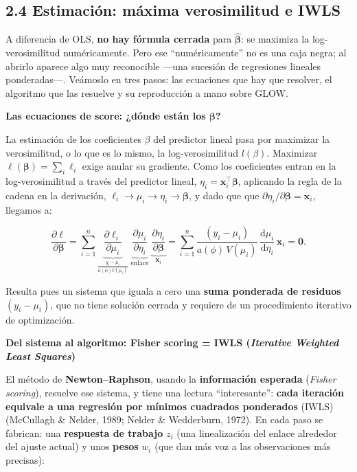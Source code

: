 \documentclass[
  letterpaper,
  DIV=11,
  numbers=noendperiod]{scrartcl}
\begin{document}
\hypertarget{sec-u12-iwls}{%
\subsection{2.4 Estimación: máxima verosimilitud e
IWLS}\label{sec-u12-iwls}}

A diferencia de OLS, \textbf{no hay fórmula cerrada} para
\(\hat{\boldsymbol\beta}\): se maximiza la log-verosimilitud
numéricamente. Pero ese ``numéricamente'' no es una caja negra; al
abrirlo aparece algo muy reconocible ---una sucesión de regresiones
lineales ponderadas---. Veámoslo en tres pasos: las ecuaciones que hay
que resolver, el algoritmo que las resuelve y su reproducción a mano
sobre GLOW.

\textbf{Las ecuaciones de score: ¿dónde están los \(\boldsymbol\beta\)?}

La estimación de los coeficientes \(\beta\) del predictor lineal pasa
por maximizar la verosimilitud, o lo que es lo mismo, la
log-verosimilitud \(l(\beta)\). Maximizar
\(\ell(\boldsymbol\beta)=\sum_i \ell_i\) exige anular su gradiente. Como
los coeficientes entran en la log-verosimilitud a través del predictor
lineal, \(\eta_i=\mathbf{x}_i^\top\boldsymbol\beta\), aplicando la regla
de la cadena en la derivación,
\(\ell_i\to\mu_i\to\eta_i\to\boldsymbol\beta\), y dado que que
\(\partial\eta_i/\partial\boldsymbol\beta=\mathbf{x}_i\), llegamos a:

\[
\frac{\partial \ell}{\partial\boldsymbol\beta}
=\sum_{i=1}^{n}
\underbrace{\frac{\partial \ell_i}{\partial\mu_i}}_{\textstyle \frac{y_i-\mu_i}{a(\phi)V(\mu_i)}}\;
\underbrace{\frac{\partial\mu_i}{\partial\eta_i}}_{\text{enlace}}\;
\underbrace{\frac{\partial\eta_i}{\partial\boldsymbol\beta}}_{\textstyle \mathbf{x}_i}
=\sum_{i=1}^{n}\frac{(y_i-\mu_i)}{a(\phi)\,V(\mu_i)}\,
\frac{\mathrm{d}\mu_i}{\mathrm{d}\eta_i}\,\mathbf{x}_i=\mathbf{0}.
\]

Resulta pues un sistema que iguala a cero una \textbf{suma ponderada de
residuos} \((y_i-\mu_i)\), que no tiene solución cerrada y requiere de
un procedimiento iterativo de optimización.

\textbf{Del sistema al algoritmo: Fisher scoring = IWLS (\emph{Iterative
Weighted Least Squares})}

El método de \textbf{Newton--Raphson}, usando la \textbf{información
esperada} (\emph{Fisher scoring}), resuelve ese sistema, y tiene una
lectura ``interesante'': \textbf{cada iteración equivale a una regresión
por mínimos cuadrados ponderados} (IWLS) (McCullagh \& Nelder, 1989;
Nelder \& Wedderburn, 1972). En cada paso se fabrican: una
\textbf{respuesta de trabajo} \(z_i\) (una linealización del enlace
alrededor del ajuste actual) y unos \textbf{pesos} \(w_i\) (que dan más
voz a las observaciones más precisas):
\end{document}
